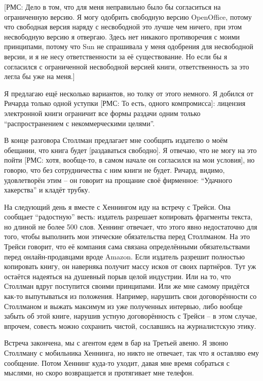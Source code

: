[РМС: Дело в том, что для меня неправильно было бы согласиться на ограниченную версию. Я могу одобрить свободную версию OpenOffice, потому что свободная версия наряду с несвободной это лучше чем ничего, при этом несвободную версию я отвергаю. Здесь нет никакого противоречия с моими принципами, потому что Sun не спрашивала у меня одобрения для несвободной версии, и я не несу ответственности за её существование. Но если бы я согласился с ограниченной несвободной версией книги, ответственность за это легла бы уже на меня.]

Я предлагаю ещё несколько вариантов, но толку от этого немного. Я добился от Ричарда только одной уступки [РМС: То есть, одного компромисса]: лицензия электронной книги ограничит все формы раздачи одним только \enquote{распространением с некоммерческими целями}.

В конце разговора Столлман предлагает мне сообщить издателю о моём обещании, что книга будет [раздаваться свободно]. Я отвечаю, что не могу на это пойти [РМС: хотя, вообще-то, в самом начале он согласился на мои условия], но говорю, что без сотрудничества с ним книги не будет. Ричард, видимо, удовлетворён этим -- он говорит на прощание своё фирменное: \enquote{Удачного хакерства} и кладёт трубку.

На следующий день я вместе с Хеннингом иду на встречу с Трейси. Она сообщает \enquote{радостную} весть: издатель разрешает копировать фрагменты текста, но длиной не более 500 слов. Хеннинг отвечает, что этого явно недостаточно для того, чтобы выполнить мои этические обязательства перед Столлманом. На это Трейси говорит, что её компания сама связана определёнными обязательствами перед онлайн-продавцами вроде Amazon. Если издатель разрешит полностью копировать книгу, он наверняка получит массу исков от своих партнёров. Тут уж остаётся надеяться на душевный порыв целой индустрии. Или на то, что Столлман вдруг поступится своими принципами. Или же мне самому придётся как-то выпутываться из положения. Например, нарушить свои договорённости со Столлманом и выжать максимум из уже полученных интервью, либо вообще забыть об этой книге, нарушив устную договорённость с Трейси -- в этом случае, впрочем, совесть можно сохранить чистой, сославшись на журналистскую этику.

Встреча закончена, мы с агентом едем в бар на Третьей авеню. Я звоню Столлману с мобильника Хеннинга, но никто не отвечает, так что я оставляю ему сообщение. Потом Хеннинг куда-то уходит, давая мне время собраться с мыслями, но скоро возвращается и протягивает мне телефон.

